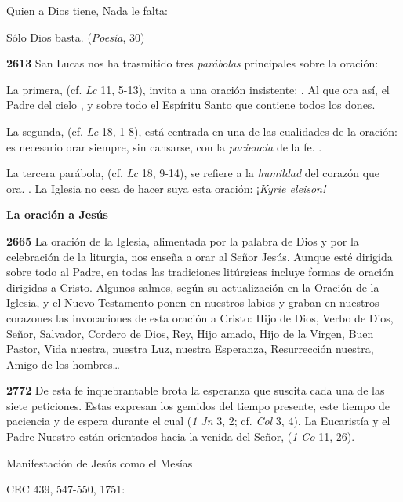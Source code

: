 Quien a Dios tiene, Nada le falta:

Sólo Dios basta. (\emph{Poesía}, 30)

\textbf{2613} San Lucas nos ha trasmitido tres \emph{parábolas} principales sobre la oración:

La primera,  (cf. \emph{Lc} 11, 5-13), invita a una oración insistente: . Al que ora así, el Padre del cielo , y sobre todo el Espíritu Santo que contiene todos los dones.

La segunda,  (cf. \emph{Lc} 18, 1-8), está centrada en una de las cualidades de la oración: es necesario orar siempre, sin cansarse, con la \emph{paciencia} de la fe. .

La tercera parábola,  (cf. \emph{Lc} 18, 9-14), se refiere a la \emph{humildad} del corazón que ora. . La Iglesia no cesa de hacer suya esta oración: ¡\emph{Kyrie eleison!}

\textbf{La oración a Jesús}

\textbf{2665} La oración de la Iglesia, alimentada por la palabra de Dios y por la celebración de la liturgia, nos enseña a orar al Señor Jesús. Aunque esté dirigida sobre todo al Padre, en todas las tradiciones litúrgicas incluye formas de oración dirigidas a Cristo. Algunos salmos, según su actualización en la Oración de la Iglesia, y el Nuevo Testamento ponen en nuestros labios y graban en nuestros corazones las invocaciones de esta oración a Cristo: Hijo de Dios, Verbo de Dios, Señor, Salvador, Cordero de Dios, Rey, Hijo amado, Hijo de la Virgen, Buen Pastor, Vida nuestra, nuestra Luz, nuestra Esperanza, Resurrección nuestra, Amigo de los hombres\ldots{}

\textbf{2772} De esta fe inquebrantable brota la esperanza que suscita cada una de las siete peticiones. Estas expresan los gemidos del tiempo presente, este tiempo de paciencia y de espera durante el cual  (\emph{1 Jn} 3, 2; cf. \emph{Col} 3, 4). La Eucaristía y el Padre Nuestro están orientados hacia la venida del Señor,  (\emph{1 Co} 11, 26).

Manifestación de Jesús como el Mesías

CEC 439, 547-550, 1751:

